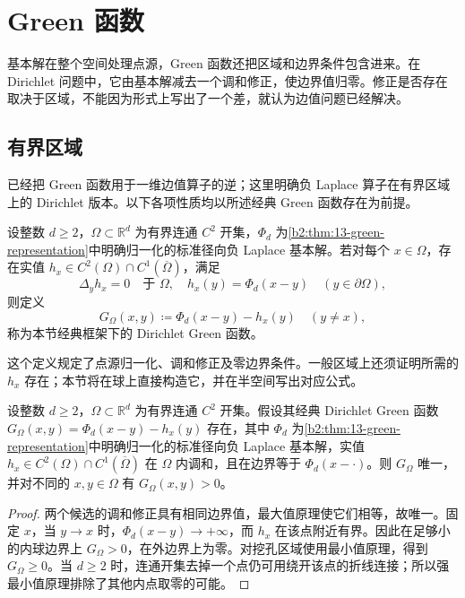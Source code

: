 \section{Green 函数}
\label{b2:sec:1304}

基本解在整个空间处理点源，Green 函数还把区域和边界条件包含进来。在 Dirichlet 问题中，它由基本解减去一个调和修正，使边界值归零。修正是否存在取决于区域，不能因为形式上写出了一个差，就认为边值问题已经解决。

\subsection{有界区域}
\label{b2:subsec:130401}

已经把 Green 函数用于一维边值算子的逆；这里明确负 Laplace 算子在有界区域上的 Dirichlet 版本。以下各项性质均以所述经典 Green 函数存在为前提。

\begin{definition}\label{b2:def:13-dirichlet-green}
设整数 \(d\geq2\)，\(\Omega\subset\mathbb R^d\) 为有界连通 \(C^2\) 开集，\(\Phi_d\) 为\cref{b2:thm:13-green-representation}中明确归一化的标准径向负 Laplace 基本解。若对每个 \(x\in\Omega\)，存在实值 \(h_x\in C^2(\Omega)\cap C^1(\overline\Omega)\)，满足
\[
 \Delta_yh_x=0\quad\text{于 }\Omega,
 \quad h_x(y)=\Phi_d(x-y)\quad(y\in\partial\Omega),
\]
则定义
\[
 G_\Omega(x,y)\coloneqq\Phi_d(x-y)-h_x(y)\quad(y\ne x),
\]
称为本节经典框架下的 Dirichlet Green 函数。
\end{definition}

这个定义规定了点源归一化、调和修正及零边界条件。一般区域上还须证明所需的 \(h_x\) 存在；本节将在球上直接构造它，并在半空间写出对应公式。

\begin{proposition}\label{b2:prop:13-green-positive}
设整数 \(d\geq2\)，\(\Omega\subset\mathbb R^d\) 为有界连通 \(C^2\) 开集。假设其经典 Dirichlet Green 函数 \(G_\Omega(x,y)=\Phi_d(x-y)-h_x(y)\) 存在，其中 \(\Phi_d\) 为\cref{b2:thm:13-green-representation}中明确归一化的标准径向负 Laplace 基本解，实值 \(h_x\in C^2(\Omega)\cap C^1(\overline\Omega)\) 在 \(\Omega\) 内调和，且在边界等于 \(\Phi_d(x-\cdot)\)。则 \(G_\Omega\) 唯一，并对不同的 \(x,y\in\Omega\) 有 \(G_\Omega(x,y)>0\)。
\end{proposition}
\begin{proof}
两个候选的调和修正具有相同边界值，最大值原理使它们相等，故唯一。固定 \(x\)，当 \(y\to x\) 时，\(\Phi_d(x-y)\to+\infty\)，而 \(h_x\) 在该点附近有界。因此在足够小的内球边界上 \(G_\Omega>0\)，在外边界上为零。对挖孔区域使用最小值原理，得到 \(G_\Omega\geq0\)。当 \(d\geq2\) 时，连通开集去掉一个点仍可用绕开该点的折线连接；所以强最小值原理排除了其他内点取零的可能。
\end{proof}

